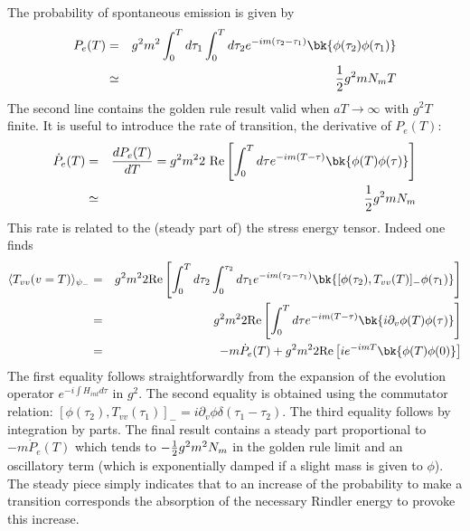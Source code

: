 \documentclass[12pt]{article}
\begin{document}
The probability of
spontaneous emission is given by
 \begin{eqnarray}
P_{e}(T) &=& g^2 m^2 \int_0^T d\tau_1 \int_0^T d\tau_2
e^{-im(\tau_2 - \tau_1)}
\bk{\phi(\tau_2)\phi(\tau_1)} \nonumber\\ &\simeq& {1 \over 2} g^2 m  N_m
T
\label{rayvi}
\end{eqnarray}
The second line contains the golden rule result valid when
$aT\to \infty$ with $g^2 T$ finite. It is useful to
introduce the rate of transition, the derivative of $P_{e}(T)$:
\begin{eqnarray}
\dot P_{e}(T) &=& {d P_{e}(T) \over dT}
= g^2 m^2 2 \mbox{ Re} \left[
\int_0^T d\tau e^{-im(T-\tau)} \bk{\phi(T)\phi(\tau)}\right] \nonumber\\
&\simeq& {1 \over 2} g^2 m N_m
\label{rayvii}
\end{eqnarray}
This rate is related to the (steady part of) the
stress energy tensor. Indeed one finds
\begin{eqnarray}
\langle T_{vv}(v
=T)\rangle_{\psi_-} &=&
g^2 m^2 2 \mbox{Re} \left[ \int_0^T d\tau_2
\int_0^{\tau_2} d\tau_1 e^{-im(\tau_2 - \tau_1)} \bk{ [\phi(\tau_2) ,
T_{vv}(T) ]_- \phi(\tau_1)}\right] \nonumber\\ &=& g^2 m^2 2 \mbox{Re}  \left[
\int_0^T d\tau e^{-im(T-\tau)} \bk{i \partial_v \phi(T) \phi(\tau)}\right]
\nonumber\\ &=& - m \dot P_{e}(T) + g^2m^2 2 \mbox{Re}  \left[ i e^{-imT} \bk{
\phi(T) \phi(0)}\right]
\label{rayviii}\end{eqnarray}
 The first equality follows
straightforwardly from the expansion of the evolution operator $e^{-i\!
\int\! H_{int} d \tau}$ in $g^2$. The second equality is obtained using
the commutator relation:
$[\phi(\tau_2) , T_{vv}(\tau_1) ]_- = i \partial_v \phi \delta (\tau_1 -
\tau_2)$. The third equality follows by
integration by parts. The final result
contains a steady part proportional to $- m \dot P_{e}(T)$ which
 tends  to $-{1
\over 2} g^2 m^2 N_m$ in the golden rule limit and an oscillatory term
(which is exponentially damped if a slight mass is given to $ \phi$). The
steady piece simply indicates that to an increase of the probability
 to make a
transition corresponds the absorption of the necessary Rindler energy to
provoke this increase.
\end{document}
